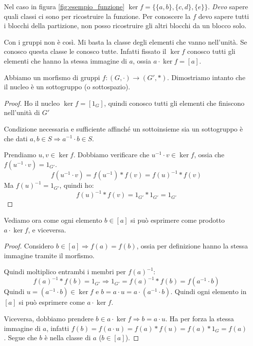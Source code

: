 Nel caso in figura \ref{fig:esempio_funzione} $\ker f = \{ \{a, b \}, \{ c, d \}, \{ e \}\}$. \textit{Devo} sapere quali classi ci sono per ricostruire la funzione. Per conoscere la $f$ devo sapere tutti i blocchi della partizione, non posso ricostruire gli altri blocchi da un blocco solo.

Con i gruppi non \`e cos\`i. Mi basta la classe degli elementi che vanno nell'unit\`a. Se conosco questa classe le conosco tutte. Infatti fissato il $\ker f$ conosco tutti gli elementi che hanno la stessa immagine di $a$, ossia $a \cdot \ker f = [a]$.

Abbiamo un morfismo di gruppi $ f : (G, \cdot ) \to (G', \ast)$. Dimostriamo intanto che il nucleo \`e un sottogruppo (o sottospazio).
\begin{proof}
Ho il nucleo $\ker f = [1_G]$, quindi conosco tutti gli elementi che finiscono nell'unit\`a di $G'$

Condizione necessaria e sufficiente affinch\'e un sottoinsieme sia un sottogruppo \`e che dati $a, b \in S \Rightarrow a^{-1} \cdot b \in S$.

Prendiamo $u, v \in \ker f$. Dobbiamo verificare che $u^{-1} \cdot v \in \ker f$, ossia che $f ( u^{-1} \cdot v ) = 1_{G'}$.
\[
f( u^{-1} \cdot v ) = f(u^{-1}) \ast f(v) = f(u)^{-1} \ast f(v)
\]
Ma $f(u)^{-1} = 1_{G'}$, quindi ho:
\[
f(u)^{-1} \ast f(v) = 1_{G'} \ast 1_{G'} = 1_{G'}
\]
\end{proof}
Vediamo ora come ogni elemento $b \in [a]$ si pu\`o esprimere come prodotto $a \cdot \ker f$, e viceversa.
\begin{proof}
Considero $b \in [a] \Rightarrow f(a) = f(b)$, ossia per definizione hanno la stessa immagine tramite il morfismo.

Quindi moltiplico entrambi i membri per $f(a)^{-1}$:
\[
f(a)^{-1} \ast f(b) = 1_{G'} \Rightarrow 1_{G'} = f(a)^{-1} \ast f(b) = f(a^{-1} \cdot b)
\]
Quindi $u = (a^{-1} \cdot b ) \in \ker f$ e $b = a \cdot u = a \cdot (a^{-1} \cdot b)$. Quindi ogni elemento in $[a]$ si pu\`o esprimere come $a \cdot \ker f$.

Viceversa, dobbiamo prendere $b \in a \cdot \ker f \Rightarrow b = a \cdot u$. Ha per forza la stessa immagine di $a$, infatti $f(b) = f(a \cdot u) = f(a) \ast f(u) = f(a) \ast 1_G = f(a)$. Segue che $b$ \`e nella classe di $a$ ($ b \in [a]$).
\end{proof}


